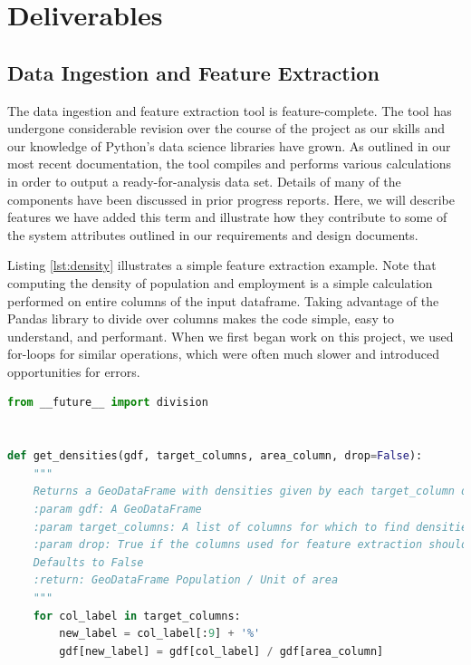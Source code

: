 \documentclass[onecolumn, draftclsnofoot,10pt, compsoc]{IEEEtran}
\begin{document}
\section{Deliverables} \label{tools}
\begin{singlespace}

\subsection{Data Ingestion and Feature Extraction}
The data ingestion and feature extraction tool is feature-complete. 
The tool has undergone considerable revision over the course of the project as our skills and our knowledge of Python's data science libraries have grown.
As outlined in our most recent documentation, the tool compiles and performs various calculations in order to output a ready-for-analysis data set. Details of many of the components have been discussed in prior progress reports. Here, we will describe features we have added this term and illustrate how they contribute to some of the system attributes outlined in our requirements and design documents.

Listing \ref{lst:density} illustrates a simple feature extraction example. Note that computing the density of population and employment is a simple calculation performed on entire columns of the input dataframe. Taking advantage of the Pandas library to divide over columns makes the code simple, easy to understand, and performant. When we first began work on this project, we used for-loops for similar operations, which were often much slower and introduced opportunities for errors.

\begin{lstlisting}[language=Python, caption={Extracting population and employment density from raw data},label={lst:density}, captionpos=b]
from __future__ import division


def get_densities(gdf, target_columns, area_column, drop=False):
    """
    Returns a GeoDataFrame with densities given by each target_column divided by the designated area_column.
    :param gdf: A GeoDataFrame
    :param target_columns: A list of columns for which to find densities
    :param drop: True if the columns used for feature extraction should be dropped after calculations.
    Defaults to False
    :return: GeoDataFrame Population / Unit of area
    """
    for col_label in target_columns:
        new_label = col_label[:9] + '%'
        gdf[new_label] = gdf[col_label] / gdf[area_column]


\end{lstlisting}
\end{singlespace}
\end{document}
